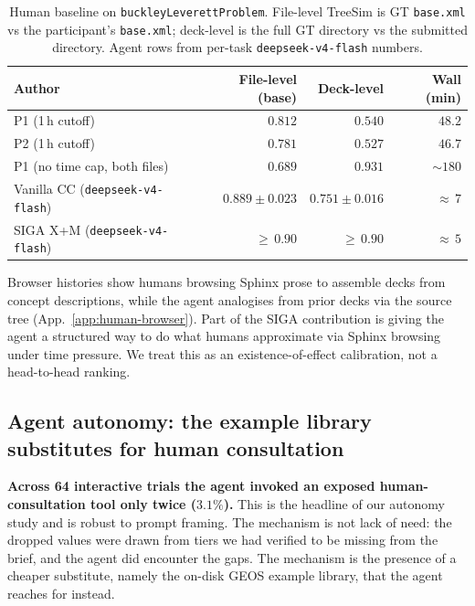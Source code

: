 \documentclass{article}
\begin{document}
\begin{table}[h]
  \caption{Human baseline on \texttt{buckleyLeverettProblem}. File-level TreeSim is GT \texttt{base.xml} vs the participant's \texttt{base.xml}; deck-level is the full GT directory vs the submitted directory. Agent rows from per-task \texttt{deepseek-v4-flash} numbers.}
  \label{tab:human-baseline}
  \centering
  \small
  \begin{tabular}{lrrr}
    \toprule
    \textbf{Author} & \textbf{File-level (base)} & \textbf{Deck-level} & \textbf{Wall (min)} \\
    \midrule
    P1 (1\,h cutoff)                          & $0.812$            & $0.540$            & $48.2$ \\
    P2 (1\,h cutoff)                          & $0.781$            & $0.527$            & $46.7$ \\
    P1 (no time cap, both files)              & $0.689$            & $0.931$            & ${\sim}180$ \\
    Vanilla CC (\texttt{deepseek-v4-flash})   & $0.889 \pm 0.023$  & $0.751 \pm 0.016$  & ${\approx}\,7$ \\
    SIGA X+M (\texttt{deepseek-v4-flash})     & ${\geq}\,0.90$     & ${\geq}\,0.90$     & ${\approx}\,5$ \\
    \bottomrule
  \end{tabular}
\end{table}

Browser histories show humans browsing Sphinx prose to assemble decks from concept descriptions, while the agent analogises from prior decks via the source tree (App.~\ref{app:human-browser}). Part of the SIGA contribution is giving the agent a structured way to do what humans approximate via Sphinx browsing under time pressure. We treat this as an existence-of-effect calibration, not a head-to-head ranking.

\subsection{Agent autonomy: the example library substitutes for human consultation}
\label{subsec:autonomy}

\textbf{Across 64 interactive trials the agent invoked an exposed human-consultation tool only twice ($3.1\%$).} This is the headline of our autonomy study and is robust to prompt framing. The mechanism is not lack of need: the dropped values were drawn from tiers we had verified to be missing from the brief, and the agent did encounter the gaps. The mechanism is the presence of a cheaper substitute, namely the on-disk GEOS example library, that the agent reaches for instead.
\end{document}
